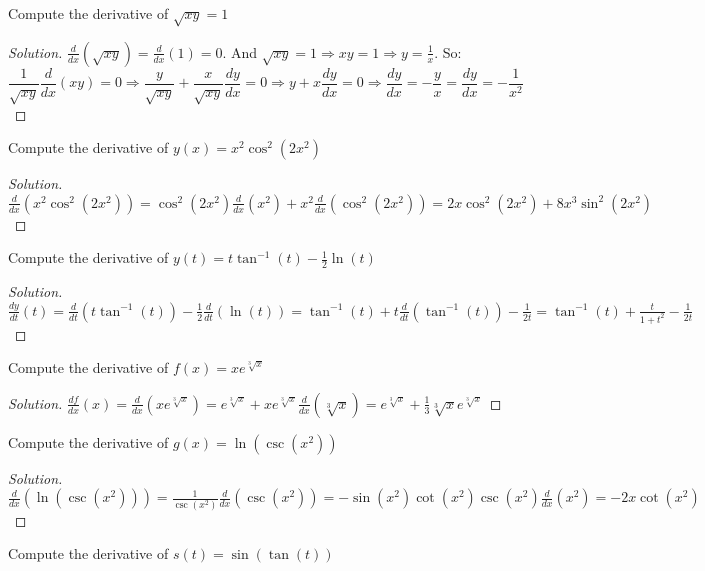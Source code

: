 \documentclass[crop=false,class=book,oneside]{standalone}
\begin{document}
\begin{problem}
Compute the derivative of $\sqrt{xy}=1$
\end{problem}
\begin{proof}[Solution]
$\frac{d}{dx}(\sqrt{xy})=\frac{d}{dx}(1)=0$. And $\sqrt{xy}=1\Rightarrow xy=1\Rightarrow y=\frac{1}{x}$. So:
\begin{equation*}
    \frac{1}{\sqrt{xy}}\frac{d}{dx}(xy)=0\Rightarrow \frac{y}{\sqrt{xy}}+\frac{x}{\sqrt{xy}}\frac{dy}{dx}=0\Rightarrow y+x\frac{dy}{dx}=0\Rightarrow\frac{dy}{dx}=-\frac{y}{x}=\frac{dy}{dx}=-\frac{1}{x^{2}}
\end{equation*}
\end{proof}
\begin{problem}
Compute the derivative of $y(x)=x^{2}\cos^{2}(2x^{2})$
\end{problem}
\begin{proof}[Solution]
$\frac{d}{dx}(x^{2}\cos^{2}(2x^{2}))=\cos^{2}(2x^{2})\frac{d}{dx}(x^{2})+x^{2}\frac{d}{dx}(\cos^{2}(2x^{2}))=2x\cos^{2}(2x^{2})+8x^{3}\sin^{2}(2x^{2})$
\end{proof}
\begin{problem}
Compute the derivative of $y(t)=t\tan^{-1}(t)-\frac{1}{2}\ln(t)$
\end{problem}
\begin{proof}[Solution]
$\frac{dy}{dt}(t)=\frac{d}{dt}(t\tan^{-1}(t))-\frac{1}{2}\frac{d}{dt}(\ln(t))=\tan^{-1}(t)+t\frac{d}{dt}(\tan^{-1}(t))-\frac{1}{2t}=\tan^{-1}(t)+\frac{t}{1+t^{2}}-\frac{1}{2t}$
\end{proof}
\begin{problem}
Compute the derivative of $f(x)=xe^{\sqrt[3]{x}}$
\end{problem}
\begin{proof}[Solution]
$\frac{df}{dx}(x)=\frac{d}{dx}(xe^{\sqrt[3]{x}})=e^{\sqrt[3]{x}}+xe^{\sqrt[3]{x}}\frac{d}{dx}(\sqrt[3]{x})=e^{\sqrt[3]{x}}+\frac{1}{3}\sqrt[3]{x}e^{\sqrt[3]{x}}$
\end{proof}
\begin{problem}
Compute the derivative of $g(x)=\ln(\csc(x^{2}))$
\end{problem}
\begin{proof}[Solution]
$\frac{d}{dx}(\ln(\csc(x^{2})))=\frac{1}{\csc(x^{2})}\frac{d}{dx}(\csc(x^{2}))=-\sin(x^{2})\cot(x^{2})\csc(x^{2})\frac{d}{dx}(x^{2})=-2x\cot(x^{2})$
\end{proof}
\begin{problem}
Compute the derivative of $s(t)=\sin(\tan(t))$
\end{problem}
\end{document}

